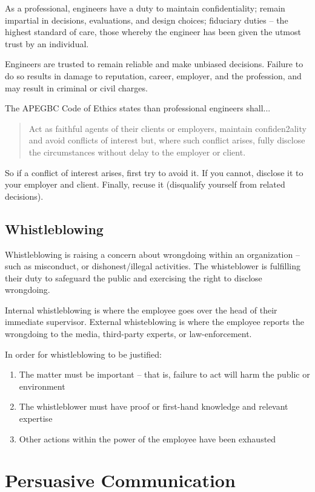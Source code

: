 \documentclass{article}
\begin{document}
As a professional, engineers have a duty to maintain confidentiality; remain impartial in decisions, evaluations, and design choices; fiduciary duties -- the highest standard of care, those whereby the engineer has been given the utmost trust by an individual.

Engineers are trusted to remain reliable and make unbiased decisions. Failure to do so results in damage to reputation, career, employer, and the profession, and may result in criminal or civil charges.

The APEGBC Code of Ethics states than professional engineers shall... \begin{quote}
Act	 as	 faithful	 agents	 of	 their	 clients	 or	 employers,	
maintain	confiden2ality	and	avoid	conflicts	of	interest	but,	
where	such	conflict	arises,	fully	disclose	the	circumstances	
without	delay	to	the	employer	or	client.
\end{quote}

So if a conflict of interest arises, first try to avoid it. If you cannot, disclose it to your employer and client. Finally, recuse it (disqualify yourself from related decisions).

\subsection{Whistleblowing}

Whistleblowing is raising a concern about wrongdoing within an organization -- such as misconduct, or dishonest/illegal activities. The whisteblower is fulfilling their duty to safeguard the public and exercising the right to disclose wrongdoing.

Internal whistleblowing is where the employee goes over the head of their immediate supervisor. External whisteblowing is where the employee reports the wrongdoing to the media, third-party experts, or law-enforcement.

In order for whistleblowing to be justified: \begin{enumerate}
\item The matter must be important -- that is, failure to act will harm the public or environment
\item The whistleblower must have proof or first-hand knowledge and relevant expertise
\item Other actions within the power of the employee have been exhausted
\end{enumerate}

\section{Persuasive Communication}
\end{document}
